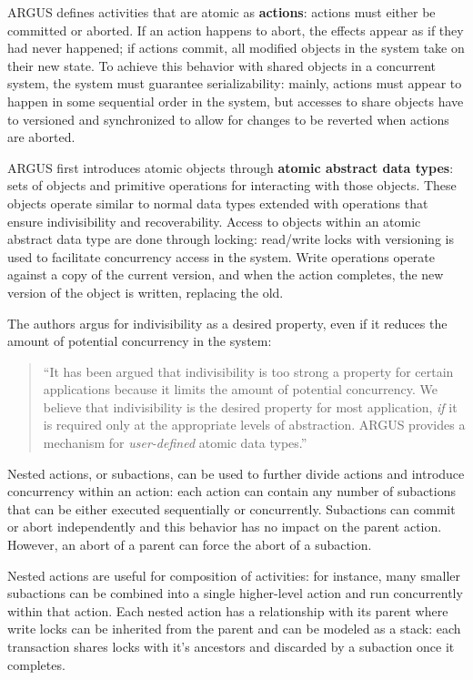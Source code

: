 ARGUS defines activities that are atomic as \textbf{actions}: actions must either be committed or aborted.  If an action happens to abort, the effects appear as if they had never happened; if actions commit, all modified objects in the system take on their new state.  To achieve this behavior with shared objects in a concurrent system, the system must guarantee serializability: mainly, actions must appear to happen in some sequential order in the system, but accesses to share objects have to versioned and synchronized to allow for changes to be reverted when actions are aborted.

ARGUS first introduces atomic objects through \textbf{atomic abstract data types}: sets of objects and primitive operations for interacting with those objects.  These objects operate similar to normal data types extended with operations that ensure indivisibility and recoverability.  Access to objects within an atomic abstract data type are done through locking: read/write locks with versioning is used to facilitate concurrency access in the system.  Write operations operate against a copy of the current version, and when the action completes, the new version of the object is written, replacing the old.

The authors argus for indivisibility as a desired property, even if it reduces the amount of potential concurrency in the system:

\begin{quote}
``It has been argued that indivisibility is too strong a property for certain applications because it limits the amount of potential concurrency.  We believe that indivisibility is the desired property for most application, \textit{if} it is required only at the appropriate levels of abstraction.  ARGUS provides a mechanism for \textit{user-defined} atomic data types.''	
\end{quote}

Nested actions, or subactions, can be used to further divide actions and introduce concurrency within an action: each action can contain any number of subactions that can be either executed sequentially or concurrently.  Subactions can commit or abort independently and this behavior has no impact on the parent action.  However, an abort of a parent can force the abort of a subaction.

Nested actions are useful for composition of activities: for instance, many smaller subactions can be combined into a single higher-level action and run concurrently within that action.  Each nested action has a relationship with its parent where write locks can be inherited from the parent and can be modeled as a stack: each transaction shares locks with it's ancestors and discarded by a subaction once it completes.

